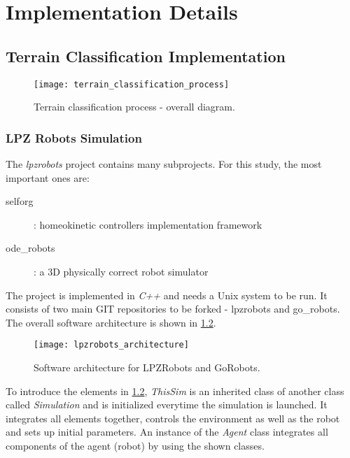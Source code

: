 \chapter{Implementation Details} \label{app:implementation_details}

\section{Terrain Classification Implementation}

\begin{figure}[H]
  \centering
  \texttt{[image: terrain\_classification\_process]}
  \caption{Terrain classification process - overall diagram.}
  \label{img:app:terrain_classification_process}
\end{figure}

\subsection*{LPZ Robots Simulation} \label{ssec:app:lpzrobots_sim}
The \textit{lpzrobots} project contains many subprojects. For this study, the most important ones are:

\begin{description}
\item[selforg] : homeokinetic controllers implementation framework
\item[ode\_robots] : a 3D physically correct robot simulator
\end{description}

The project is implemented in \textit{C++} and needs a Unix system to be run. It consists of two main GIT repositories to be forked - lpzrobots and go\_robots. The overall software architecture is shown in \cref{img:lpzrobots_architecture}.

\begin{figure}[H]
  \centering
  \texttt{[image: lpzrobots\_architecture]}
  \caption{Software architecture for LPZRobots and GoRobots. \citep{misc:lpzrobots}}
  \label{img:lpzrobots_architecture}
\end{figure}

To introduce the elements in \cref{img:lpzrobots_architecture}, \textit{ThisSim} is an inherited class of another class called \textit{Simulation} and is initialized everytime the simulation is launched. It integrates all elements together, controls the environment as well as the robot and sets up initial parameters. An instance of the \textit{Agent} class integrates all components of the agent (robot) by using the shown classes.

